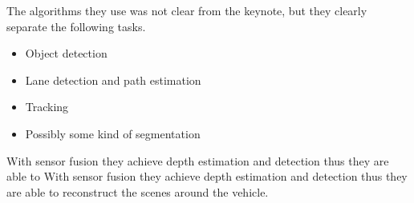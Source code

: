 The algorithms they use was not clear from the keynote, but they clearly
separate the following tasks.

\begin{itemize}
  \item Object detection
  \item Lane detection and path estimation
  \item Tracking
  \item Possibly some kind of segmentation
\end{itemize}

With sensor fusion they achieve depth estimation and detection thus they are able to
With sensor fusion they achieve depth estimation and detection thus they are able to
reconstruct the scenes around the vehicle.